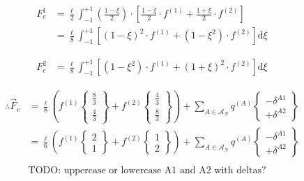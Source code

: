 \begin{equation}%
\begin{aligned}
F_e^1 &= \frac{\ell}{2} \int_{-1}^{+1} \left(\frac{1-\xi}{2}\right) \cdot \left[
	\frac{1-\xi}{2}\cdot f^{(1)}
	+ \frac{1+\xi}{2}\cdot f^{(2)}
\right] \\
&= \frac{\ell}{8} \int_{-1}^{+1} \left[
	\left(1-\xi\right)^2\cdot f^{(1)}
	+ \left(1-\xi^2\right)\cdot f^{(2)}
\right] \text{d} \xi
\end{aligned}
\end{equation}

\begin{equation}%
\begin{aligned}
F_e^2 &= \frac{\ell}{8} \int_{-1}^{+1} \left[
	(1-\xi^2)\cdot f^{(1)} + (1+\xi)^2\cdot f^{(2)}
\right] \text{d}\xi
\end{aligned}
\end{equation}


\begin{equation}%
\begin{aligned}
\therefore \vec{F}_e &= \frac{\ell}{8} \left(
	f^{(1)} \begin{Bmatrix} \frac{8}{3} \\ \frac{4}{3} \end{Bmatrix}
	+ f^{(2)} \begin{Bmatrix} \frac{4}{3} \\ \frac{8}{3} \end{Bmatrix}
\right)
+ \sum_{A \in \mathcal{A}_N} q^{(A)} \begin{Bmatrix} -\delta^{A1} \\ +\delta^{A2} \end{Bmatrix} \\
&= \frac{\ell}{6} \left(
	f^{(1)} \begin{Bmatrix} 2 \\ 1 \end{Bmatrix}
	+ f^{(2)} \begin{Bmatrix} 1 \\ 2 \end{Bmatrix}
\right)
+ \sum_{A \in \mathcal{A}_N} q^{(A)} \begin{Bmatrix} -\delta^{A1} \\ +\delta^{A2} \end{Bmatrix} \\\\
& \text{TODO:  uppercase or lowercase A1 and A2 with deltas?}
\end{aligned}
\end{equation}


